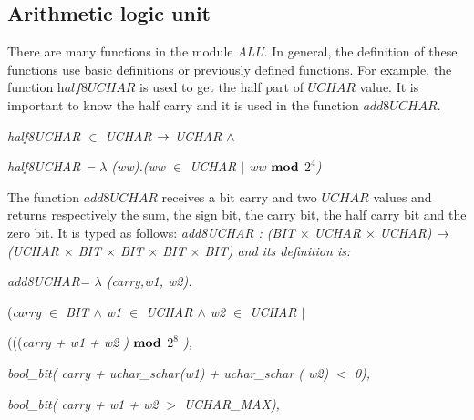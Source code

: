 \documentclass[a4paper]{llncs}
\begin{document}
\subsection{Arithmetic logic unit}
 
There are many functions in the module \textit{ALU}. In general, the definition of these 
functions use basic definitions or previously defined functions. For example, the function
$\textit{half8UCHAR}$ is used to get the half part of $\textit{UCHAR}$ value.
It is important to know the half carry and it is used in the function $\textit{add8UCHAR}$. 

\hspace*{0.0in}

\hspace*{0.0in}\it half8UCHAR  $\in$  \it UCHAR  $\fun$  \it UCHAR  $\land$ 

\hspace*{0.0in}\it half8UCHAR \rm =  $\lambda$  \rm (\it ww\rm )\rm .\rm (\it ww  $\in$  \it UCHAR  $\mid$  \it ww  $\mod$  \it $2^{4}$\rm )

\hspace*{0.0in}

 
The function $\textit{add8UCHAR}$ receives a bit carry and two $\textit{UCHAR}$ values and returns respectively the 
sum, the sign bit, the carry bit, the half carry bit and the zero bit. It is typed as follows: \it add8UCHAR \rm :
\rm (\it BIT $\times$ \it UCHAR $\times$ \it UCHAR\rm ) $\fun$ \rm (\it UCHAR $\times$  \it BIT  $\times$  \it BIT  $\times$  \it BIT  $\times$  \it BIT\rm ) and its definition is:

\hspace*{0.0in}\it add8UCHAR\rm = $\lambda$ \rm(\it carry\rm,\it w1\rm, \it w2\rm)\rm.\rm

\hspace*{0.0in}(\it carry $\in$  \it BIT  $\land$  \it w1  $\in$  \it UCHAR  $\land$  \it w2  $\in$  \it UCHAR
$\mid$

\hspace*{0.40in}\rm(\rm(\rm(\it carry \rm + \it w1 \rm + \it w2 \rm )  $\mod$  \it $2^{8}$ \rm ),

\hspace*{0.40in}\it bool\_bit\rm ( \it carry \rm + \it uchar\_schar\rm (\it w1\rm ) \rm + \it uchar\_schar \rm (\it
w2\rm ) $<$ \rm 0\rm ),

\hspace*{0.40in}\it bool\_bit\rm ( \it carry \rm + \it w1 \rm + \it w2 $>$ \it UCHAR\_MAX\rm )\rm ,
\end{document}
